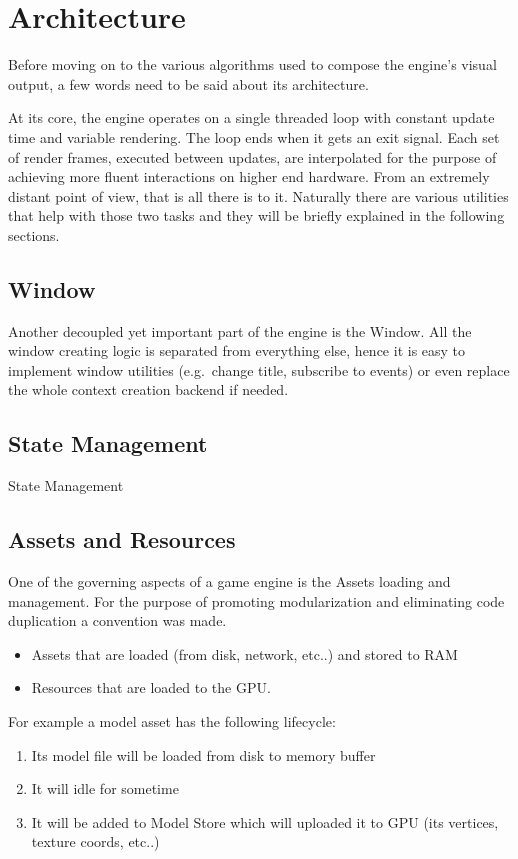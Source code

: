\section{Architecture}
Before moving on to the various algorithms used to compose the engine's visual output, a few
words need to be said about its architecture.

At its core, the engine operates on a single threaded loop with constant update time and
variable rendering. The loop ends when it gets an exit signal. Each set of render frames,
executed between updates, are interpolated for the purpose of achieving more fluent interactions
on higher end hardware. From an extremely distant point of view, that is all there is to it.
Naturally there are various utilities that help with those two tasks and they will be briefly
explained in the following sections.

\subsection{Window}
Another decoupled yet important part of the engine is the Window. All the window creating logic
is separated from everything else, hence it is easy to implement window utilities (e.g.\ change
title, subscribe to events) or even replace the whole context creation backend if needed.

\subsection{State Management}
State Management

\subsection{Assets and Resources}
One of the governing aspects of a game engine is the Assets loading and management. For the
purpose of promoting modularization and eliminating code duplication a convention was made.

\begin{itemize}
\item Assets that are loaded (from disk, network, etc..) and stored to RAM
\item Resources that are loaded to the GPU\@.
\end{itemize}

\noindent For example a model asset has the following lifecycle:

\begin{enumerate}
\item Its model file will be loaded from disk to memory buffer
\item It will idle for sometime
\item It will be added to Model Store which will uploaded it to GPU (its vertices, texture coords,
      etc..)
\end{enumerate}

